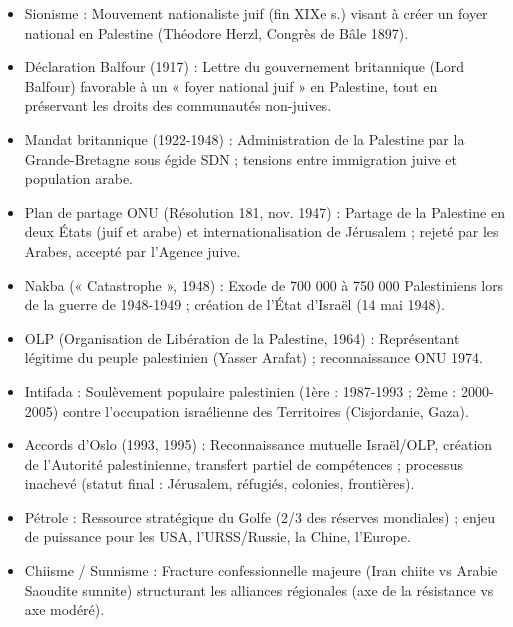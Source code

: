 \documentclass[11pt]{article}
\newcommand{\cle}[1]{{\popxbold\color{popdark}#1}}
\newcounter{popsec}
\newcounter{popsub}
\newcommand{\courssub}[1]{%
  \stepcounter{popsub}%
  \par\vspace{9pt}\noindent{\popxbold\fontsize{11.5}{13}\selectfont\color{popink}{\color{poporange}\thepopsec.\thepopsub}\hspace{6pt}#1}\par\nopagebreak\vspace{4pt}
}
\begin{document}
\begin{bilan}
\courssub{Définitions \& Concepts clés}
\begin{itemize}
  \item \cle{Sionisme} : Mouvement nationaliste juif (fin XIXe s.) visant à créer un foyer national en Palestine (Théodore Herzl, Congrès de Bâle 1897).
  \item \cle{Déclaration Balfour} (1917) : Lettre du gouvernement britannique (Lord Balfour) favorable à un « foyer national juif » en Palestine, tout en préservant les droits des communautés non-juives.
  \item \cle{Mandat britannique} (1922-1948) : Administration de la Palestine par la Grande-Bretagne sous égide SDN ; tensions entre immigration juive et population arabe.
  \item \cle{Plan de partage ONU} (Résolution 181, nov. 1947) : Partage de la Palestine en deux États (juif et arabe) et internationalisation de Jérusalem ; rejeté par les Arabes, accepté par l'Agence juive.
  \item \cle{Nakba} (« Catastrophe », 1948) : Exode de 700 000 à 750 000 Palestiniens lors de la guerre de 1948-1949 ; création de l'État d'Israël (14 mai 1948).
  \item \cle{OLP} (Organisation de Libération de la Palestine, 1964) : Représentant légitime du peuple palestinien (Yasser Arafat) ; reconnaissance ONU 1974.
  \item \cle{Intifada} : Soulèvement populaire palestinien (1ère : 1987-1993 ; 2ème : 2000-2005) contre l'occupation israélienne des Territoires (Cisjordanie, Gaza).
  \item \cle{Accords d'Oslo} (1993, 1995) : Reconnaissance mutuelle Israël/OLP, création de l'Autorité palestinienne, transfert partiel de compétences ; processus inachevé (statut final : Jérusalem, réfugiés, colonies, frontières).
  \item \cle{Pétrole} : Ressource stratégique du Golfe (2/3 des réserves mondiales) ; enjeu de puissance pour les USA, l'URSS/Russie, la Chine, l'Europe.
  \item \cle{Chiisme / Sunnisme} : Fracture confessionnelle majeure (Iran chiite vs Arabie Saoudite sunnite) structurant les alliances régionales (axe de la résistance vs axe modéré).
\end{itemize}


\end{bilan}
\end{document}
